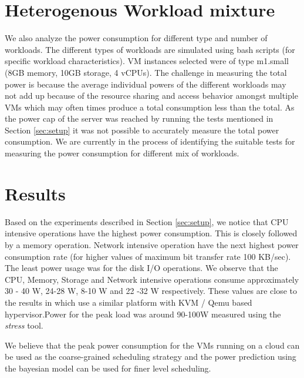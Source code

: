\documentclass[singlecolumn,letterpaper,12pt]{article}
\begin{document}
\section{Heterogenous Workload mixture}
\label{sec:hetro-workload-mix}
We also analyze the power consumption for different type and number of workloads. The different types of workloads are simulated using bash scripts (for specific workload characteristics). VM instances selected were of type m1.small (8GB memory, 10GB storage, 4 vCPUs). The challenge in measuring the total power is because the average individual powers of the different workloads may not add up because of the resource sharing and access behavior amongst multiple VMs which may often times produce a total consumption less than the total. As the power cap of the server was reached by running the tests mentioned in Section \ref{sec:setup} it was not possible to accurately measure the total power consumption. We are currently in the process of identifying the suitable tests for measuring the power consumption for different mix of workloads.


\section{Results}
\label{sec:results}
Based on the experiments described in Section \ref{sec:setup}, we notice that CPU intensive operations have the highest power consumption. This is closely followed by a memory operation. Network intensive operation have the next highest power consumption rate (for higher values of maximum bit transfer rate  100 KB/sec). The least power usage was for the disk I/O operations. We observe that the CPU, Memory, Storage and Network intensive operations consume approximately 30 - 40 W, 24-28 W, 8-10 W and 22 -32 W respectively. These values are close to the results in \cite{vm-power-meter} which use a similar platform with KVM / Qemu based hypervisor.Power for the peak load was around 90-100W measured using the \emph{stress} tool.

We believe that the peak power consumption for the VMs running on a cloud can be used as the coarse-grained scheduling strategy and the power prediction using the bayesian model can be used for finer level scheduling.
\end{document}
